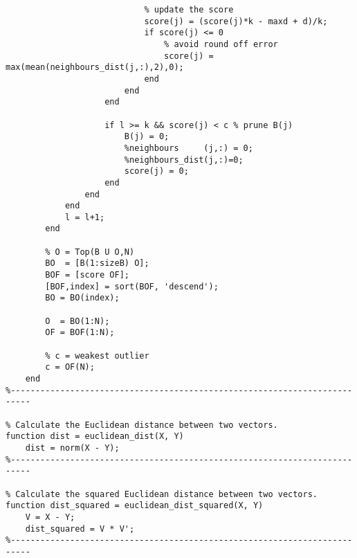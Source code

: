 \begin{lstlisting}
                            % update the score
                            score(j) = (score(j)*k - maxd + d)/k;
                            if score(j) <= 0
                                % avoid round off error
                                score(j) = max(mean(neighbours_dist(j,:),2),0);
                            end
                        end
                    end

                    if l >= k && score(j) < c % prune B(j)
                        B(j) = 0;
                        %neighbours     (j,:) = 0;
                        %neighbours_dist(j,:)=0;
                        score(j) = 0;
                    end
                end
            end
            l = l+1;
        end

        % O = Top(B U O,N)
        BO  = [B(1:sizeB) O];
        BOF = [score OF];
        [BOF,index] = sort(BOF, 'descend');
        BO = BO(index);

        O  = BO(1:N);
        OF = BOF(1:N);

        % c = weakest outlier
        c = OF(N);
    end
%--------------------------------------------------------------------------

% Calculate the Euclidean distance between two vectors.
function dist = euclidean_dist(X, Y)
    dist = norm(X - Y);
%--------------------------------------------------------------------------

% Calculate the squared Euclidean distance between two vectors.
function dist_squared = euclidean_dist_squared(X, Y)
    V = X - Y;
    dist_squared = V * V';
%--------------------------------------------------------------------------
\end{lstlisting}

